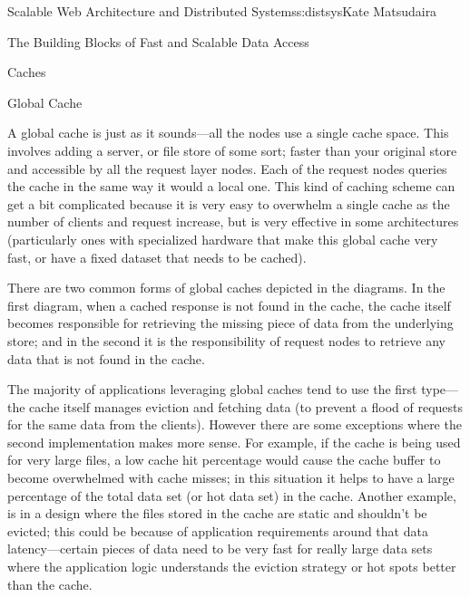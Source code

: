 \begin{aosachapter}{Scalable Web Architecture and Distributed Systems}{s:distsys}{Kate Matsudaira}
\begin{aosasect1}{The Building Blocks of Fast and Scalable Data Access}
\begin{aosasect2}{Caches}
\end{aosasect2}

\begin{aosasect2}{Global Cache}

A global cache is just as it sounds---all the nodes use a single cache
space. This involves adding a server, or file store of some sort;
faster than your original store and accessible by all the request
layer nodes. Each of the request nodes queries the cache in the same
way it would a local one. This kind of caching scheme can get a bit
complicated because it is very easy to overwhelm a single cache as the
number of clients and request increase, but is very effective in some
architectures (particularly ones with specialized hardware that make
this global cache very fast, or have a fixed dataset that needs to be
cached).



There are two common forms of global caches depicted in the
diagrams. In the first diagram, when a cached response is not found in
the cache, the cache itself becomes responsible for retrieving the
missing piece of data from the underlying store; and in the second it
is the responsibility of request nodes to retrieve any data that is
not found in the cache.

The majority of applications leveraging global caches tend to use the
first type---the cache itself manages eviction and fetching data (to
prevent a flood of requests for the same data from the
clients). However there are some exceptions where the second
implementation makes more sense. For example, if the cache is being
used for very large files, a low cache hit percentage would cause the
cache buffer to become overwhelmed with cache misses; in this
situation it helps to have a large percentage of the total data set
(or hot data set) in the cache. Another example, is in a design where
the files stored in the cache are static and shouldn't be evicted;
this could be because of application requirements around that data
latency---certain pieces of data need to be very fast for really large
data sets where the application logic understands the eviction
strategy or hot spots better than the cache.

\end{aosasect2}


\end{aosasect1}
\end{aosachapter}
